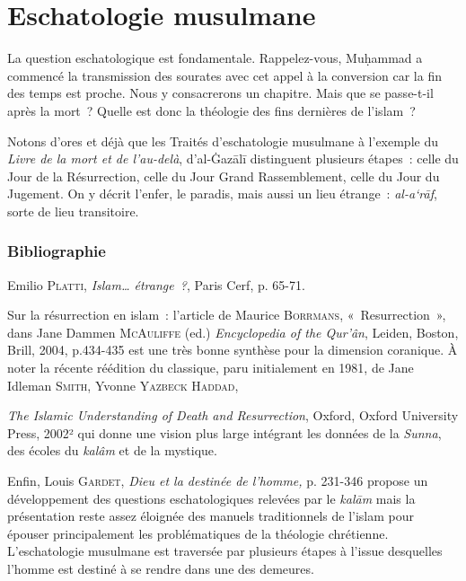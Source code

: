 \chapter{Eschatologie musulmane}

La question eschatologique est fondamentale. Rappelez-vous, Muḥammad a
commencé la transmission des sourates avec cet appel à la conversion car
la fin des temps est proche. Nous y consacrerons un chapitre. Mais que
se passe-t-il après la mort~? Quelle est donc la théologie des fins
dernières de l'islam~?

Notons d'ores et déjà que les Traités d'eschatologie musulmane à
l'exemple du \emph{Livre de la mort et de l'au-delà}, d'al-Ġazālī
distinguent plusieurs étapes~: celle du Jour de la Résurrection, celle
du Jour Grand Rassemblement, celle du Jour du Jugement. On y décrit
l'enfer, le paradis, mais aussi un lieu étrange~: \emph{al-a`rāf}, sorte
de lieu transitoire.


\subsection{Bibliographie}

Emilio \textsc{Platti}, \emph{Islam\ldots{} étrange~?}, Paris Cerf, p.
65-71.

Sur la résurrection en islam~: l'article de Maurice \textsc{Borrmans},
«~Resurrection~», dans Jane Dammen \textsc{McAuliffe} (ed.)
\emph{Encyclopedia of the Qur'ân}, Leiden, Boston, Brill, 2004,
p.434-435 est une très bonne synthèse pour la dimension coranique. À
noter la récente réédition du classique, paru initialement en 1981, de
Jane Idleman \textsc{Smith}, Yvonne \textsc{Yazbeck Haddad,}


\emph{The
Islamic Understanding of Death and Resurrection}, Oxford, Oxford
University Press, 2002² qui donne une vision plus large intégrant les
données de la \emph{Sunna}, des écoles du \emph{kalâm} et de la
mystique. 

Enfin, Louis \textsc{Gardet}, \emph{Dieu et la destinée de
l'homme,} p. 231-346 propose un développement des questions
eschatologiques relevées par le \emph{kalām} mais la présentation reste
assez éloignée des manuels traditionnels de l'islam pour épouser
principalement les problématiques de la théologie chrétienne. \\


L'eschatologie musulmane est traversée par plusieurs étapes à l'issue
desquelles l'homme est destiné à se rendre dans une des demeures.

